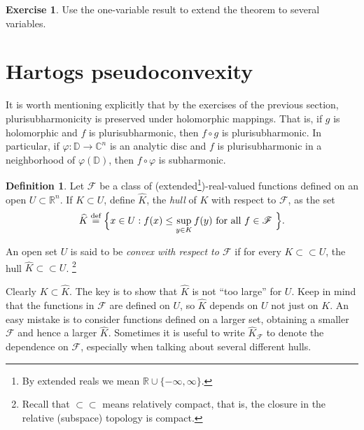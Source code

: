 \documentclass[12pt,openany]{book}
\newcommand{\C}{{\mathbb{C}}}
\newcommand{\R}{{\mathbb{R}}}
\newcommand{\D}{{\mathbb{D}}}
\newcommand{\sF}{{\mathscr{F}}}
\newcommand{\myindex}[1]{#1\index{#1}}
\theoremstyle{plain}
\theoremstyle{remark}
\theoremstyle{definition}
\newtheorem{defn}[thm]{Definition}
\newenvironment{exbox}{%
    \def\FrameCommand{\vrule width 1pt \relax\hspace{10pt}}%
    \MakeFramed{\advance\hsize-\width\FrameRestore}%
}{%
    \endMakeFramed
}
\theoremstyle{exercise}
\newtheorem{exercise}{Exercise}[section]
\theoremstyle{example}
\begin{document}
\begin{exbox}
\begin{exercise}
Use the one-variable result to extend the theorem to several variables.
\end{exercise}
\end{exbox}


\section{Hartogs pseudoconvexity}

It is worth mentioning explicitly that by the
exercises of the previous section,
plurisubharmonicity is preserved under holomorphic mappings.
That is, if $g$ is holomorphic and $f$ is plurisubharmonic, then
$f \circ g$ is plurisubharmonic.  In particular, if $\varphi \colon \D \to
\C^n$ is an analytic disc and $f$ is plurisubharmonic in a neighborhood of
$\varphi(\D)$,
then $f \circ \varphi$ is subharmonic.

\begin{defn}
Let $\sF$ be a class of (extended\footnote{%
By extended reals we mean $\R \cup \{ -\infty,\infty\}$.})-real-valued
functions defined on an open $U \subset \R^n$.  If $K
\subset U$, define $\widehat{K}$, the \emph{\myindex{hull}} of $K$ with
respect to $\sF$, as the set
%
\begin{equation*}
\widehat{K} \overset{\text{def}}{=} \Bigl\{ x \in U : f(x) \leq \sup_{y\in K} f(y)
\text{ for all $f \in \sF$ } \Bigr\} .
\end{equation*}

An open set $U$ is said to be \emph{convex with respect to $\sF$}\index{convex!with respect to $\sF$}
if for every $K \subset \subset U$, the hull $\widehat{K} \subset \subset U$.%
\footnote{Recall that $\subset \subset$ means relatively compact, that is,
the closure in the relative (subspace) topology is compact.}
\end{defn}

Clearly $K \subset \widehat{K}$.  The key is to show that $\widehat{K}$
is not ``too large'' for $U$.
Keep in mind that the functions in $\sF$ are defined on $U$, so $\widehat{K}$
depends on $U$ not just on $K$.  An easy mistake is to consider functions defined
on a larger set, obtaining a smaller $\sF$ and hence a larger
$\widehat{K}$.  Sometimes it is useful to write $\widehat{K}_{\sF}$ to
denote the dependence on $\sF$, especially when talking about several different
hulls.
\end{document}
